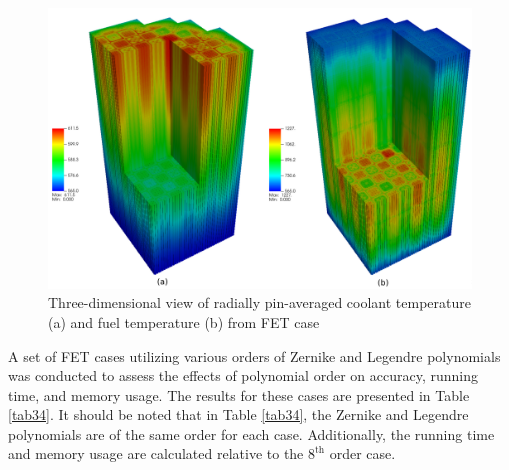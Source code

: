 \begin{figure}
    \centering
    \includegraphics[width=1.0\textwidth]{figs/fuel.pdf}
    \caption[Three-dimensional view of radially pin-averaged coolant and  fuel temperatures]{Three-dimensional view of radially pin-averaged coolant temperature (a) and fuel temperature (b) from FET case}
    \label{fig_49}
\end{figure}

A set of FET cases utilizing various orders of Zernike and Legendre polynomials was conducted to assess the effects of polynomial order on accuracy, running time, and memory usage. The results for these cases are presented in Table \ref{tab34}. It should be noted that in Table \ref{tab34}, the Zernike and Legendre polynomials are of the same order for each case. Additionally, the running time and memory usage are calculated relative to the $8^\text{th}$ order case.


